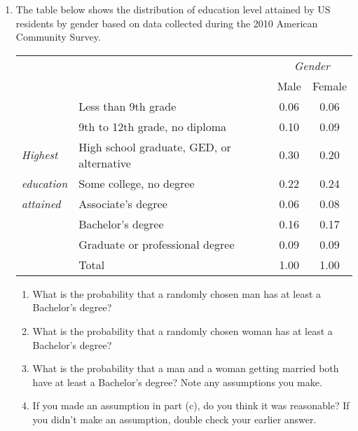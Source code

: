 \documentclass{article}\usepackage[]{graphicx}\usepackage[]{color}
\begin{document}
\begin{enumerate}
\item The table below shows the distribution of education level attained by US residents by gender based on data collected during the 2010 American Community Survey.
\begin{center}
\begin{tabular}{l p{7cm} c c }
&  					& \multicolumn{2}{c}{\textit{Gender}} \\
\cline{3-4}
&												& Male	& Female \\
\cline{2-4}
& Less than 9th grade								&0.06	&0.06	 \\
& 9th to 12th grade, no diploma						&0.10	&0.09	 \\
\textit{Highest} & High school graduate, GED, or alternative	&0.30	&0.20	 \\
\textit{education} & Some college, no degree				&0.22	&0.24	 \\ 
\textit{attained} & Associate's degree					&0.06	&0.08	 \\
& Bachelor's degree									&0.16	&0.17	 \\
& Graduate or professional degree						&0.09	&0.09	 \\
\cline{2-4}
& Total											& 1.00	& 1.00
\end{tabular}
\end{center}
\begin{enumerate}
\item What is the probability that a randomly chosen man has at least a Bachelor's degree?
\item What is the probability that a randomly chosen woman has at least a Bachelor's degree?
\item What is the probability that a man and a woman getting married both have at least a Bachelor's degree? Note any assumptions you make.
\item If you made an assumption in part (c), do you think it was reasonable? If you didn't make an assumption, double check your earlier answer.
\end{enumerate}




\end{enumerate}
\end{document}
